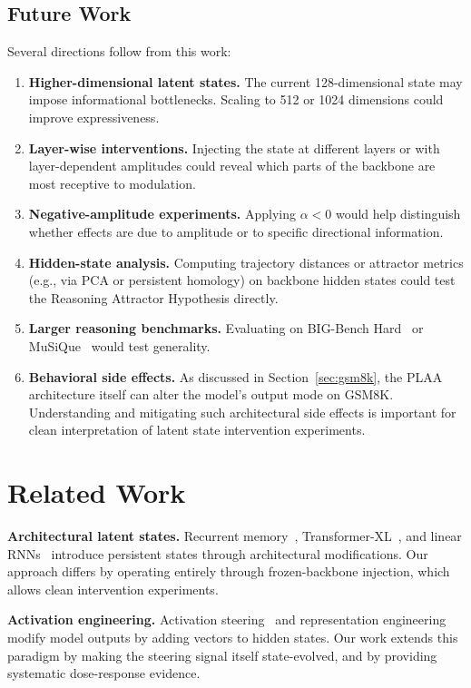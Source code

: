 \documentclass[11pt,a4paper]{article}
\begin{document}
\subsection{Future Work}

Several directions follow from this work:

\begin{enumerate}
    \item \textbf{Higher-dimensional latent states.} The current 128-dimensional state may impose informational bottlenecks. Scaling to 512 or 1024 dimensions could improve expressiveness.
    \item \textbf{Layer-wise interventions.} Injecting the state at different layers or with layer-dependent amplitudes could reveal which parts of the backbone are most receptive to modulation.
    \item \textbf{Negative-amplitude experiments.} Applying $\alpha < 0$ would help distinguish whether effects are due to amplitude or to specific directional information.
    \item \textbf{Hidden-state analysis.} Computing trajectory distances or attractor metrics (e.g., via PCA or persistent homology) on backbone hidden states could test the Reasoning Attractor Hypothesis directly.
    \item \textbf{Larger reasoning benchmarks.} Evaluating on BIG-Bench Hard~\cite{suzgun2022challenging} or MuSiQue~\cite{trivedi2022musique} would test generality.
    \item \textbf{Behavioral side effects.} As discussed in Section~\ref{sec:gsm8k}, the PLAA architecture itself can alter the model's output mode on GSM8K. Understanding and mitigating such architectural side effects is important for clean interpretation of latent state intervention experiments.
\end{enumerate}

\section{Related Work}

\textbf{Architectural latent states.} Recurrent memory~\cite{graves2014neural}, Transformer-XL~\cite{dai2019transformer}, and linear RNNs~\cite{gu2022efficiently} introduce persistent states through architectural modifications. Our approach differs by operating entirely through frozen-backbone injection, which allows clean intervention experiments.

\textbf{Activation engineering.} Activation steering~\cite{turner2023activation, rimsky2023steering} and representation engineering~\cite{zou2023representation} modify model outputs by adding vectors to hidden states. Our work extends this paradigm by making the steering signal itself state-evolved, and by providing systematic dose-response evidence.
\end{document}
